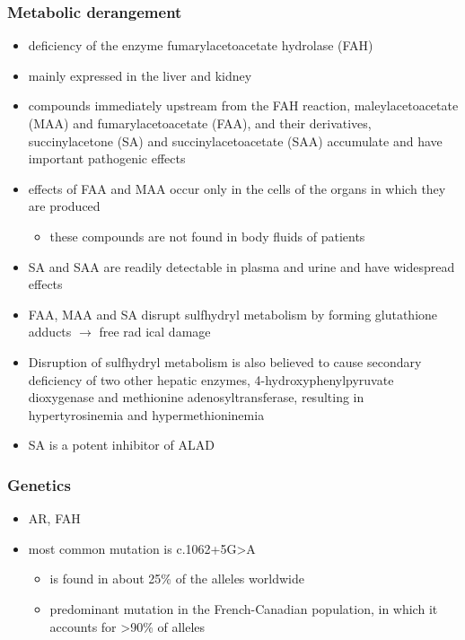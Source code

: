 \documentclass{scrartcl}
\begin{document}
\subsubsection{Metabolic derangement}
\label{sec:orge405fdd}
\begin{itemize}
\item deficiency of the enzyme fumarylacetoacetate hydrolase (FAH)
\end{itemize}
\begin{itemize}
\item mainly expressed in the liver and kidney
\item compounds immediately upstream from the FAH reaction,
maleylacetoacetate (MAA) and fumarylacetoacetate (FAA), and their
derivatives, succinylacetone (SA) and succinylacetoacetate (SAA)
accumulate and have important pathogenic effects
\item effects of FAA and MAA occur only in the cells of the organs in which they are produced
\begin{itemize}
\item these compounds are not found in body fluids of patients
\end{itemize}
\item SA and SAA are readily detectable in plasma and urine and have
widespread effects
\item FAA, MAA and SA disrupt sulfhydryl metabolism by forming glutathione
adducts \(\to\) free rad ical damage
\item Disruption of sulfhydryl metabolism is also believed to cause
secondary deficiency of two other hepatic enzymes,
4-hydroxyphenylpyruvate dioxygenase and methionine
adenosyltransferase, resulting in hypertyrosinemia and
hypermethioninemia
\item SA is a potent inhibitor of ALAD
\end{itemize}

\subsubsection{Genetics}
\label{sec:org0590bb8}
\begin{itemize}
\item AR, FAH
\item most common mutation is c.1062+5G>A
\begin{itemize}
\item is found in about 25\% of the alleles worldwide
\item predominant mutation in the French-Canadian population, in which
it accounts for >90\% of alleles
\end{itemize}
\end{itemize}
\end{document}
